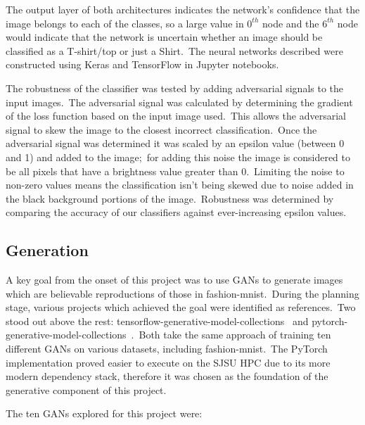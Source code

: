 \documentclass[conference]{IEEEtran}
\begin{document}
    The output layer of both architectures indicates the network's confidence that the image belongs to each of the classes, so a large value in \(0^{th}\) node and the \(6^{th}\) node would indicate that the network is uncertain whether an image should be classified as a T-shirt/top or just a Shirt.\ The neural networks described were constructed using Keras and TensorFlow in Jupyter notebooks.

    The robustness of the classifier was tested by adding adversarial signals to the input images.\ The adversarial signal was calculated by determining the gradient of the loss function based on the input image used.\ This allows the adversarial signal to skew the image to the closest incorrect classification.\ Once the adversarial signal was determined it was scaled by an epsilon value (between 0 and 1) and added to the image;\ for adding this noise the image is considered to be all pixels that have a brightness value greater than 0.\ Limiting the noise to non-zero values means the classification isn't being skewed due to noise added in the black background portions of the image.\ Robustness was determined by comparing the accuracy of our classifiers against ever-increasing epsilon values.

    \subsection{Generation}\label{subsec:implementation-generation}

    A key goal from the onset of this project was to use GANs to generate images which are believable reproductions of those in fashion-mnist.\ During the planning stage, various projects which achieved the goal were identified as references.\ Two stood out above the rest: tensorflow-generative-model-collections~\cite{tensorflow-generative-model-collections} and pytorch-generative-model-collections~\cite{original-pytorch-generative-model-collections}.\ Both take the same approach of training ten different GANs on various datasets, including fashion-mnist.\ The PyTorch implementation proved easier to execute on the SJSU HPC due to its more modern dependency stack, therefore it was chosen as the foundation of the generative component of this project.

    The ten GANs explored for this project were:
\end{document}
